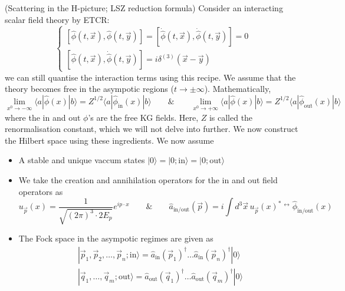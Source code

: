 \begin{defi}
(Scattering in the H-picture; LSZ reduction formula) Consider an interacting scalar field theory by ETCR:
\[\begin{cases}
[\hat{\phi }(t,\vec{x}),\hat{\phi }(t,\vec{y})]=[\dot{\hat{\phi }}(t,\vec{x}),\dot{\hat{\phi }}(t,\vec{y})]=0\\
[\hat{\phi }(t,\vec{x}),\dot{\hat{\phi }}(t,\vec{y})]=i\delta ^{(3)}(\vec{x}-\vec{y})
\end{cases}\]
we can still quantise the interaction terms using this recipe. We assume that the theory becomes free in the asympotic regions ($t\rightarrow \pm \infty $). Mathematically,
\[\lim _{x^{0}\rightarrow -\infty }\langle a|\hat{\phi }(x)|b\rangle =Z^{1/2}\langle a|\hat{\phi }_{\mathrm{in}}(x)|b\rangle\qquad\&\qquad \lim _{x^{0}\rightarrow +\infty }\langle a|\hat{\phi}(x)|b\rangle =Z^{1/2}\langle a|\hat{\phi }_{\mathrm{out}}(x)|b\rangle  \]
where the in and out $\phi $'s are the free KG fields. Here, $Z$ is called the renormalisation constant, which we will not delve into further. We now construct the Hilbert space using these ingredients. We now assume
\begin{itemize}
\item[(i)] A stable and unique vaccum states $|0\rangle =|0;\mathrm{in}\rangle =|0;\mathrm{out}\rangle $
\item[(ii)] We take the creation and annihilation operators for the in and out field operators as
\[u_{\vec{p}}(x)=\dfrac{1}{\sqrt{(2\pi )^3\cdot 2E_{p}}}e^{ip\cdot x}\qquad\&\qquad \hat{a}_{\mathrm{in/out}}(\vec{p})=i\int d^3\vec{x}\,u_{\vec{p}}(x)^{*}\mathop{\partial _{0}}^{\leftrightarrow }\hat{\phi }_{\mathrm{in/out}}(x)\]
\item[(iii)] The Fock space in the asympotic regimes are given as
\[\begin{align*}
|\vec{p}_{1},\vec{p}_{2},\ldots,\vec{p}_{n};\mathrm{in }\rangle =\hat{a}_{\mathrm{in}}(\vec{p}_{1})^{\dagger }\ldots \hat{a}_{\mathrm{in}}(\vec{p}_{n})^{\dagger }|0\rangle \\
|\vec{q}_{1},\ldots ,\vec{q}_{m};\mathrm{out}\rangle =\hat{a}_{\mathrm{out}}(\vec{q}_{1})^{\dagger }\ldots \hat{a}_{\mathrm{out}}(\vec{q}_{m})^{\dagger }|0\rangle 
\end{align*}\]
\end{itemize}
\end{defi}
\vspace{2ex}
